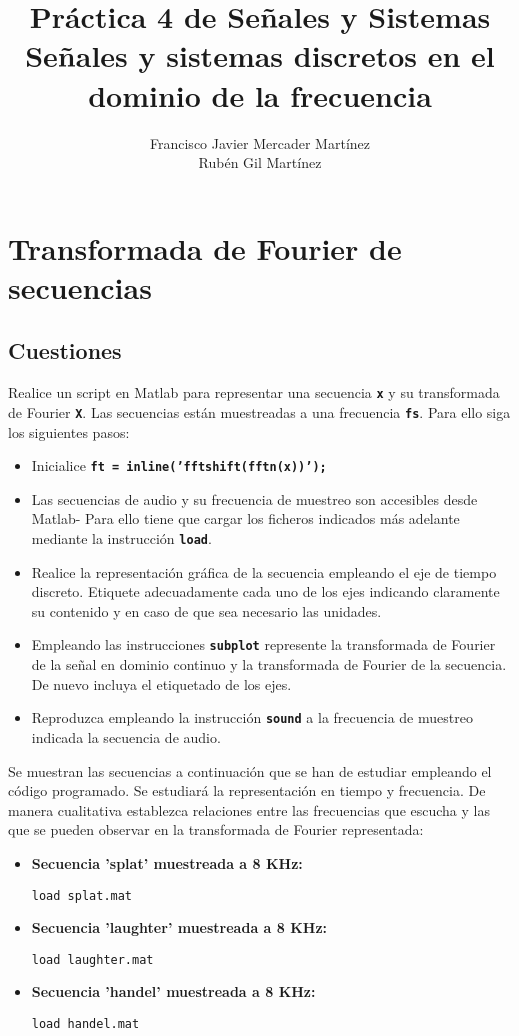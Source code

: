 \documentclass{article}
\title{\textbf{\huge Práctica 4 de Señales y Sistemas}\\ Señales y sistemas discretos en el dominio de la frecuencia}
\author{Francisco Javier Mercader Martínez\\ Rubén Gil Martínez}
\date{}
\newcommand{\code}[1]{\texttt{\textbf{#1}}}
\begin{document}
\maketitle

\section{Transformada de Fourier de secuencias}
\subsection*{Cuestiones}
Realice un script en Matlab para representar una secuencia \code{x} y su transformada de Fourier \code{X}. Las secuencias están muestreadas a una frecuencia \code{fs}. Para ello siga los siguientes pasos:
\begin{itemize}
\item Inicialice \code{ft = inline('fftshift(fftn(x))');}
\item Las secuencias de audio y su frecuencia de muestreo son accesibles desde Matlab- Para ello tiene que cargar los ficheros indicados más adelante mediante la instrucción \code{load}.
\item Realice la representación gráfica de la secuencia empleando el eje de tiempo discreto. Etiquete adecuadamente cada uno de los ejes indicando claramente su contenido y en caso de que sea necesario las unidades.
\item Empleando las instrucciones \code{subplot} represente la transformada de Fourier de la señal en dominio continuo y la transformada de Fourier de la secuencia. De nuevo incluya el etiquetado de los ejes.
\item Reproduzca empleando la instrucción \code{sound} a la frecuencia de muestreo indicada la secuencia de audio.
\end{itemize}
Se muestran las secuencias a continuación que se han de estudiar empleando el código programado. Se estudiará la representación en tiempo y frecuencia. De manera cualitativa establezca relaciones entre las frecuencias que escucha y las que se pueden observar en la transformada de Fourier representada:
\begin{itemize}
\item \textbf{Secuencia 'splat' muestreada a 8 KHz:} 
\begin{lstlisting}
load splat.mat
\end{lstlisting}
\item \textbf{Secuencia 'laughter' muestreada a 8 KHz:}
\begin{lstlisting}
load laughter.mat
\end{lstlisting}
\item \textbf{Secuencia 'handel' muestreada a 8 KHz:}
\begin{lstlisting}
load handel.mat
\end{lstlisting}
\end{itemize}
\end{document}

